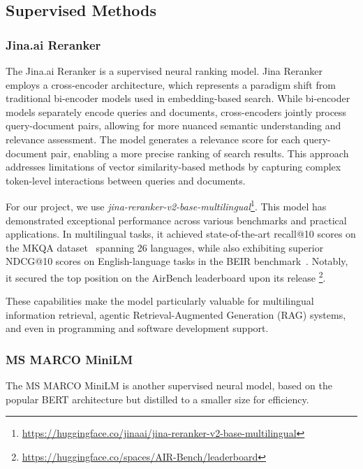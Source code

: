 \subsection{Supervised Methods}\label{subsec:supervised-methods}

\subsubsection{Jina.ai Reranker}
The Jina.ai Reranker is a supervised neural ranking model.
Jina Reranker employs a cross-encoder architecture, which represents a paradigm shift from traditional bi-encoder models used in embedding-based search.
While bi-encoder models separately encode queries and documents, cross-encoders jointly process query-document pairs, allowing for more nuanced semantic understanding and relevance assessment.
The model generates a relevance score for each query-document pair, enabling a more precise ranking of search results.
This approach addresses limitations of vector similarity-based methods by capturing complex token-level interactions between queries and documents.

For our project, we use \textit{jina-reranker-v2-base-multilingual}\footnote{\url{https://huggingface.co/jinaai/jina-reranker-v2-base-multilingual}}.
This model has demonstrated exceptional performance across various benchmarks and practical applications.
In multilingual tasks, it achieved state-of-the-art recall@10 scores on the MKQA dataset~\cite{mkqa} spanning 26 languages, while also exhibiting superior NDCG@10 scores on English-language tasks in the BEIR benchmark~\cite{thakur2021beirheterogenousbenchmarkzeroshot}.
Notably, it secured the top position on the AirBench leaderboard upon its release \footnote{\url{https://huggingface.co/spaces/AIR-Bench/leaderboard}}.

These capabilities make the model particularly valuable for multilingual information retrieval, agentic Retrieval-Augmented Generation (RAG) systems, and even in programming and software development support.

\subsubsection{MS MARCO MiniLM}
The MS MARCO MiniLM is another supervised neural model, based on the popular BERT architecture but distilled to a smaller size for efficiency.

